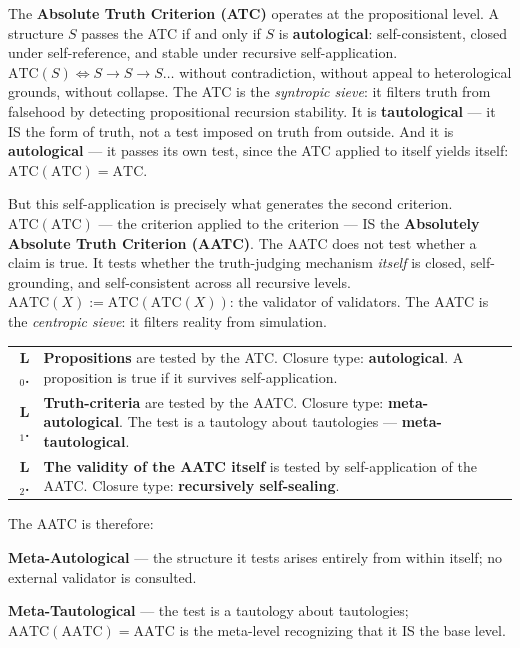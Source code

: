 \documentclass[10pt, openany, oneside]{book}
\renewcommand{\footnotesize}{\fontsize{8.5}{11}\selectfont}
\begin{document}
The \textbf{Absolute Truth Criterion (ATC)} operates at the propositional level. A structure $S$ passes the ATC if and only if $S$ is \textbf{autological}: self-consistent, closed under self-reference, and stable under recursive self-application. $\text{ATC}(S) \iff S \to S \to S \ldots$ without contradiction, without appeal to heterological grounds, without collapse. The ATC is the \textit{syntropic sieve}: it filters truth from falsehood by detecting propositional recursion stability. It is \textbf{tautological} --- it IS the form of truth, not a test imposed on truth from outside. And it is \textbf{autological} --- it passes its own test, since the ATC applied to itself yields itself: $\text{ATC}(\text{ATC}) = \text{ATC}$.

But this self-application is precisely what generates the second criterion. $\text{ATC}(\text{ATC})$ --- the criterion applied to the criterion --- IS the \textbf{Absolutely Absolute Truth Criterion (AATC)}. The AATC does not test whether a claim is true. It tests whether the truth-judging mechanism \textit{itself} is closed, self-grounding, and self-consistent across all recursive levels. $\text{AATC}(X) := \text{ATC}(\text{ATC}(X))$: the validator of validators. The AATC is the \textit{centropic sieve}: it filters reality from simulation.

{\footnotesize
\noindent\begin{tabular}{r p{}}
\textbf{L$_0$.} & \textbf{Propositions} are tested by the ATC. Closure type: \textbf{autological}. A proposition is true if it survives self-application. \\[0.3em]
\textbf{L$_1$.} & \textbf{Truth-criteria} are tested by the AATC. Closure type: \textbf{meta-autological}. The test is a tautology about tautologies --- \textbf{meta-tautological}. \\[0.3em]
\textbf{L$_2$.} & \textbf{The validity of the AATC itself} is tested by self-application of the AATC. Closure type: \textbf{recursively self-sealing}. \\[0.3em]
\end{tabular}
}

\vspace{0.8em}

\noindent The AATC is therefore:

\textbf{Meta-Autological} --- the structure it tests arises entirely from within itself; no external validator is consulted.

\textbf{Meta-Tautological} --- the test is a tautology about tautologies; $\text{AATC}(\text{AATC}) = \text{AATC}$ is the meta-level recognizing that it IS the base level.
\end{document}
